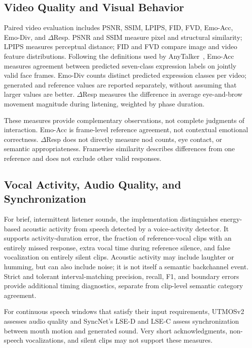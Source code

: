 \subsection{Video Quality and Visual Behavior}
Paired video evaluation includes PSNR, SSIM, LPIPS, FID, FVD, Emo-Acc, Emo-Div, and $\Delta$Resp. PSNR and SSIM measure pixel and structural similarity; LPIPS measures perceptual distance; FID and FVD compare image and video feature distributions. Following the definitions used by AnyTalker~\cite{anytalker}, Emo-Acc measures agreement between predicted seven-class expression labels on jointly valid face frames. Emo-Div counts distinct predicted expression classes per video; generated and reference values are reported separately, without assuming that larger values are better. $\Delta$Resp measures the difference in average eye-and-brow movement magnitude during listening, weighted by phase duration.

These measures provide complementary observations, not complete judgments of interaction. Emo-Acc is frame-level reference agreement, not contextual emotional correctness. $\Delta$Resp does not directly measure nod counts, eye contact, or semantic appropriateness. Framewise similarity describes differences from one reference and does not exclude other valid responses.

\subsection{Vocal Activity, Audio Quality, and Synchronization}
For brief, intermittent listener sounds, the implementation distinguishes energy-based acoustic activity from speech detected by a voice-activity detector. It supports activity-duration error, the fraction of reference-vocal clips with an entirely missed response, extra vocal time during reference silence, and false vocalization on entirely silent clips. Acoustic activity may include laughter or humming, but can also include noise; it is not itself a semantic backchannel event. Strict and tolerant interval-matching precision, recall, F1, and boundary errors provide additional timing diagnostics, separate from clip-level semantic category agreement.

For continuous speech windows that satisfy their input requirements, UTMOSv2 assesses audio quality and SyncNet's LSE-D and LSE-C assess synchronization between mouth motion and generated sound. Very short acknowledgments, non-speech vocalizations, and silent clips may not support these measures.

